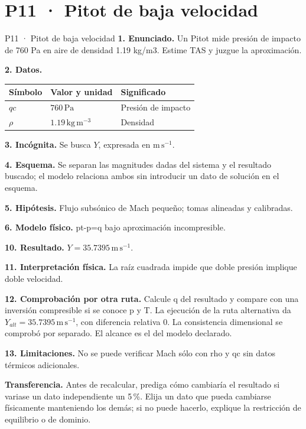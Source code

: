 \chapter*{P11 · Pitot de baja velocidad}
\begin{studiumworked}{P11 · Pitot de baja velocidad}
\textbf{1. Enunciado.} Un Pitot mide presión de impacto de 760 Pa en aire de densidad 1.19 kg/m3. Estime TAS y juzgue la aproximación.

\textbf{2. Datos.}
\begin{longtable}{p{.16\linewidth}p{.35\linewidth}p{.38\linewidth}}\toprule Símbolo & Valor y unidad & Significado\\\midrule\endhead
$qc$ & $760\,\mathrm{Pa}$ & Presión de impacto\\
$\rho$ & $1.19\,\mathrm{kg\,m^{-3}}$ & Densidad\\
\bottomrule\end{longtable}
\textbf{3. Incógnita.} Se busca $Y$, expresada en $\mathrm{m\,s^{-1}}$.

\textbf{4. Esquema.} Se separan las magnitudes dadas del sistema y el resultado buscado; el modelo relaciona ambos sin introducir un dato de solución en el esquema.

\textbf{5. Hipótesis.} Flujo subsónico de Mach pequeño; tomas alineadas y calibradas.

\textbf{6. Modelo físico.} pt-p=q bajo aproximación incompresible.


\textbf{10. Resultado.} $Y=35.7395\,\mathrm{m\,s^{-1}}$.

\textbf{11. Interpretación física.} La raíz cuadrada impide que doble presión implique doble velocidad.

\textbf{12. Comprobación por otra ruta.} Calcule q del resultado y compare con una inversión compresible si se conoce p y T. La ejecución de la ruta alternativa da $Y_{alt}=35.7395\,\mathrm{m\,s^{-1}}$, con diferencia relativa $0$. La consistencia dimensional se comprobó por separado. El alcance es el del modelo declarado.

\textbf{13. Limitaciones.} No se puede verificar Mach sólo con rho y qc sin datos térmicos adicionales.

\textbf{Transferencia.} Antes de recalcular, prediga cómo cambiaría el resultado si variase un dato independiente un 5\,\%. Elija un dato que pueda cambiarse físicamente manteniendo los demás; si no puede hacerlo, explique la restricción de equilibrio o de dominio.\par
\end{studiumworked}
